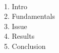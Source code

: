 \documentclass[preview]{standalone}
\begin{document}
\begin{center}
\flushleft \\ 1. Intro\\ 2. Fundamentals\\ 3. Issue\\ 4. Results\\ 5. Conclusion
\end{center}
\end{document}
